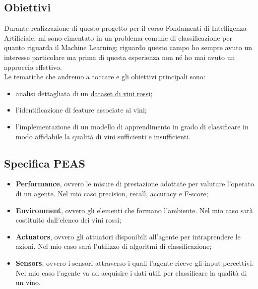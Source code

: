 \documentclass{article}
\begin{document}
\begin{titlepage}
        
        \subsection{Obiettivi}
            Durante realizzazione di questo progetto per il corso Fondamenti di Intelligenza Artificiale, mi sono cimentato in un problema comune di classificazione per quanto riguarda il Machine Learning; riguardo questo campo ho sempre avuto un interesse particolare ma prima di questa esperienza non né ho mai avuto un approccio effettivo. \\
            Le tematiche che andremo a toccare e gli obiettivi principali sono:
             \begin{itemize}
                \item analisi dettagliata di un \href{https://www.kaggle.com/datasets/uciml/red-wine-quality-cortez-et-al-2009}{dataset di vini rossi};
                \item l'identificazione di feature associate ai vini;
                \item l'implementazione di un modello di apprendimento in grado di classificare in modo affidabile la qualità di vini sufficienti e insufficienti.
            \end{itemize}
            
        \subsection{Specifica PEAS}
        \begin{itemize}
            \item \textbf{Performance}, ovvero le misure di prestazione adottate per valutare l’operato di un agente. Nel mio caso precision, recall, accuracy e F-score;
            \item \textbf{Environment}, ovvero gli elementi che formano l’ambiente. Nel mio caso sarà costituito dall'elenco dei vini rossi;
            \item \textbf{Actuators}, ovvero gli attuatori disponibili all’agente per intraprendere le azioni. Nel mio caso sarà l'utilizzo di algoritmi di classificazione;
            \item \textbf{Sensors}, ovvero i sensori attraverso i quali l'agente riceve gli input percettivi. Nel mio caso l'agente va ad acquisire i dati utili per classificare la qualità di un vino.
        \end{itemize}

        \newpage

\end{titlepage}
\end{document}
